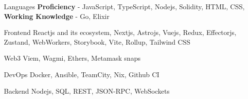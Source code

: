 

\begin{cvskills}

  \cvskill
    {Languages} %
    {\textbf{Proficiency} - JavaScript, TypeScript, Nodejs, Solidity, HTML, CSS, \textbf{Working Knowledge} - Go, Elixir} %

  \cvskill
    {Frontend} %
    {Reactjs and its ecosystem, Nextjs, Astrojs, Vuejs, Redux, Effectorjs, Zustand, WebWorkers, Storybook, Vite, Rollup, Tailwind CSS} %

  \cvskill
    {Web3} %
    {Viem, Wagmi, Ethers, Metamask snaps} %

  \cvskill
    {DevOps} %
    {Docker, Ansible, TeamCity, Nix, Github CI} %

  \cvskill
    {Backend} %
    {Nodejs, SQL, REST, JSON-RPC, WebSockets} %

\end{cvskills}
